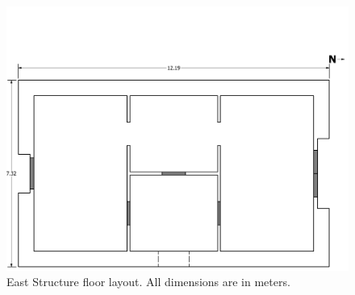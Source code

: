 \documentclass[12pt,oneside]{book}
\begin{document}
\begin{figure}[!ht]
\includegraphics[trim=0cm 0cm 0.25cm 4cm, clip=true, width=6in]{../Drawings/East_Structure_Metric_Simple}
\caption[East Structure floor layout]{East Structure floor layout. All dimensions are in meters.}
\label{fig:east_general_plan}
\end{figure}

\clearpage
\end{document}
